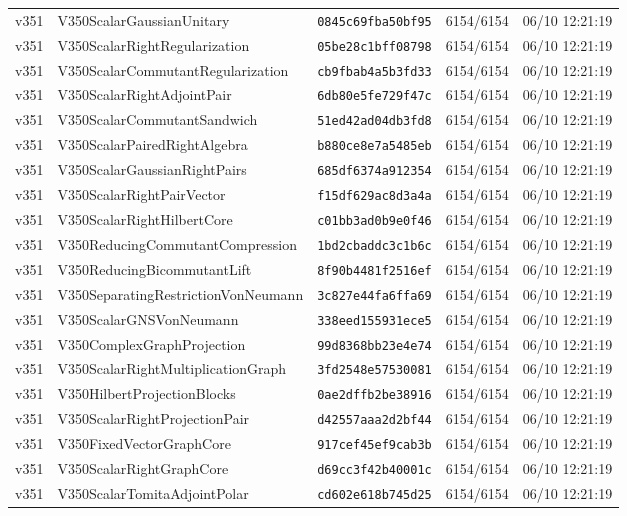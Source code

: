 \documentclass[11pt]{article}
\theoremstyle{definition}\newtheorem{deriv}{Derivation}
\begin{document}
{\begin{longtable}{@{}lllll@{}}
v351 & V350ScalarGaussianUnitary & \texttt{0845c69fba50bf95} & 6154/6154 & 06/10 12:21:19 \\
v351 & V350ScalarRightRegularization & \texttt{05be28c1bff08798} & 6154/6154 & 06/10 12:21:19 \\
v351 & V350ScalarCommutantRegularization & \texttt{cb9fbab4a5b3fd33} & 6154/6154 & 06/10 12:21:19 \\
v351 & V350ScalarRightAdjointPair & \texttt{6db80e5fe729f47c} & 6154/6154 & 06/10 12:21:19 \\
v351 & V350ScalarCommutantSandwich & \texttt{51ed42ad04db3fd8} & 6154/6154 & 06/10 12:21:19 \\
v351 & V350ScalarPairedRightAlgebra & \texttt{b880ce8e7a5485eb} & 6154/6154 & 06/10 12:21:19 \\
v351 & V350ScalarGaussianRightPairs & \texttt{685df6374a912354} & 6154/6154 & 06/10 12:21:19 \\
v351 & V350ScalarRightPairVector & \texttt{f15df629ac8d3a4a} & 6154/6154 & 06/10 12:21:19 \\
v351 & V350ScalarRightHilbertCore & \texttt{c01bb3ad0b9e0f46} & 6154/6154 & 06/10 12:21:19 \\
v351 & V350ReducingCommutantCompression & \texttt{1bd2cbaddc3c1b6c} & 6154/6154 & 06/10 12:21:19 \\
v351 & V350ReducingBicommutantLift & \texttt{8f90b4481f2516ef} & 6154/6154 & 06/10 12:21:19 \\
v351 & V350SeparatingRestrictionVonNeumann & \texttt{3c827e44fa6ffa69} & 6154/6154 & 06/10 12:21:19 \\
v351 & V350ScalarGNSVonNeumann & \texttt{338eed155931ece5} & 6154/6154 & 06/10 12:21:19 \\
v351 & V350ComplexGraphProjection & \texttt{99d8368bb23e4e74} & 6154/6154 & 06/10 12:21:19 \\
v351 & V350ScalarRightMultiplicationGraph & \texttt{3fd2548e57530081} & 6154/6154 & 06/10 12:21:19 \\
v351 & V350HilbertProjectionBlocks & \texttt{0ae2dffb2be38916} & 6154/6154 & 06/10 12:21:19 \\
v351 & V350ScalarRightProjectionPair & \texttt{d42557aaa2d2bf44} & 6154/6154 & 06/10 12:21:19 \\
v351 & V350FixedVectorGraphCore & \texttt{917cef45ef9cab3b} & 6154/6154 & 06/10 12:21:19 \\
v351 & V350ScalarRightGraphCore & \texttt{d69cc3f42b40001c} & 6154/6154 & 06/10 12:21:19 \\
v351 & V350ScalarTomitaAdjointPolar & \texttt{cd602e618b745d25} & 6154/6154 & 06/10 12:21:19 \\

\end{longtable}}
\end{document}
